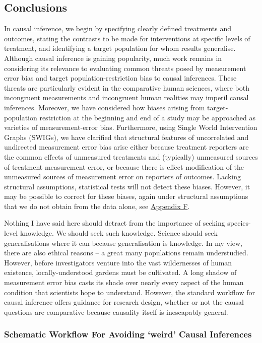 \documentclass[
  single column]{article}
\begin{document}
\subsection{Conclusions}\label{conclusions}

In causal inference, we begin by specifying clearly defined treatments
and outcomes, stating the contrasts to be made for interventions at
specific levels of treatment, and identifying a target population for
whom results generalise. Although causal inference is gaining
popularity, much work remains in considering its relevance to evaluating
common threats posed by measurement error bias and target
population-restriction bias to causal inferences. These threats are
particularly evident in the comparative human sciences, where both
incongruent measurements and incongruent human realities may imperil
causal inferences. Moreover, we have considered how biases arising from
target-population restriction at the beginning and end of a study may be
approached as varieties of measurement-error bias. Furthermore, using
Single World Intervention Graphs (SWIGs), we have clarified that
structural features of uncorrelated and undirected measurement error
bias arise either because treatment reporters are the common effects of
unmeasured treatments and (typically) unmeasured sources of treatment
measurement error, or because there is effect modification of the
unmeasured sources of measurement error on reporters of outcomes.
Lacking structural assumptions, statistical tests will not detect these
biases. However, it may be possible to correct for these biases, again
under structural assumptions that we do not obtain from the data alone,
see \hyperref[id-app-f]{Appendix F}.

Nothing I have said here should detract from the importance of seeking
species-level knowledge. We should seek such knowledge. Science should
seek generalisations where it can because generalisation is knowledge.
In my view, there are also ethical reasons -- a great many populations
remain understudied. However, before investigators venture into the vast
wildernesses of human existence, locally-understood gardens must be
cultivated. A long shadow of measurement error bias casts its shade over
nearly every aspect of the human condition that scientists hope to
understand. However, the standard workflow for causal inference offers
guidance for research design, whether or not the causal questions are
comparative because causality itself is inescapably general.

\subsubsection{Schematic Workflow For Avoiding `weird' Causal
Inferences}\label{schematic-workflow-for-avoiding-weird-causal-inferences}
\end{document}

